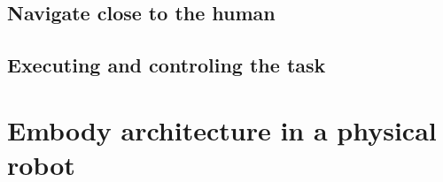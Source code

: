 \subsection{Navigate close to the human}

\subsection{Executing and controling the task}


\section{Embody architecture in a physical robot}

